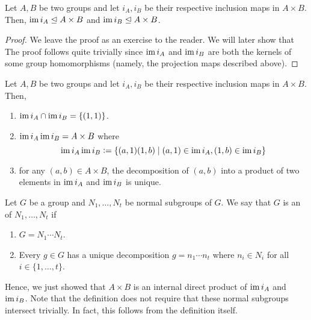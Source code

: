 \begin{cor} \label{cor:image-of-inclusion-is-normal}
    Let $A,B$ be two groups and let $i_A, i_B$ be their respective inclusion maps in $A \times B$. Then, $\operatorname{im} i_A \trianglelefteq A \times B$ and $\operatorname{im} i_B \trianglelefteq A \times B$.
\end{cor}
\begin{proof}
    We leave the proof as an exercise to the reader. We will later show that The proof follows quite trivially since $\operatorname{im} i_A$ and $\operatorname{im} i_B$ are both the kernels of some group homomorphisms (namely, the projection maps described above).
\end{proof}
\begin{prop} \label{prop:idp-of-inclusion}
    Let $A,B$ be two groups and let $i_A, i_B$ be their respective inclusion maps in $A \times B$. Then, 
    \begin{enumerate}
        \item $\operatorname{im} i_A \cap \operatorname{im} i_B = \{ (1,1) \}$.
        \item $\operatorname{im} i_A \operatorname{im} i_B = A \times B$ where
        \[
            \operatorname{im} i_A \operatorname{im} i_B \vcentcolon= \left\{ (a,1)(1,b) \mid (a,1) \in \operatorname{im} i_A, (1,b) \in \operatorname{im} i_B \right\}
        \]
        \item for any $(a,b) \in A \times B$, the decomposition of $(a,b)$ into a product of two elements in $\operatorname{im} i_A$ and $\operatorname{im} i_B$ is unique.
    \end{enumerate}
\end{prop}

\begin{defn}
    Let $G$ be a group and $N_1, \ldots, N_t$ be normal subgroups of $G$. We say that $G$ is an  of $N_1, \ldots, N_t$ if
    \begin{enumerate}
        \item $G = N_1 \cdots N_t$.
        \item Every $g \in G$ has a unique decomposition $g = n_1 \cdots n_t$ where $n_i \in N_i$ for all $i \in \{1, \ldots, t\}$.
    \end{enumerate}
\end{defn}

Hence, we just showed that $A \times B$ is an internal direct product of $\operatorname{im} i_A$ and $\operatorname{im} i_B$. Note that the definition does not require that these normal subgroups intersect trivially. In fact, this follows from the definition itself.

